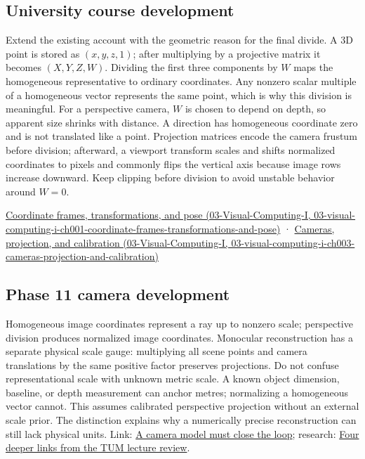\subsection{University course development}\label{appendix-cb3b26862282-university-course-development}

Extend the existing account with the geometric reason for the final divide. A 3D point is stored as \((x,y,z,1)\); after multiplying by a projective matrix it becomes \((X,Y,Z,W)\). Dividing the first three components by \(W\) maps the homogeneous representative to ordinary coordinates. Any nonzero scalar multiple of a homogeneous vector represents the same point, which is why this division is meaningful. For a perspective camera, \(W\) is chosen to depend on depth, so apparent size shrinks with distance. A direction has homogeneous coordinate zero and is not translated like a point. Projection matrices encode the camera frustum before division; afterward, a viewport transform scales and shifts normalized coordinates to pixels and commonly flips the vertical axis because image rows increase downward. Keep clipping before division to avoid unstable behavior around \(W=0\).

\href{../03-Visual-Computing-I/main.pdf\#nameddest=03-visual-computing-i-ch001-coordinate-frames-transformations-and-pose}{Coordinate frames, transformations, and pose (03-Visual-Computing-I, 03-visual-computing-i-ch001-coordinate-frames-transformations-and-pose)} · \href{../03-Visual-Computing-I/main.pdf\#nameddest=03-visual-computing-i-ch003-cameras-projection-and-calibration}{Cameras, projection, and calibration (03-Visual-Computing-I, 03-visual-computing-i-ch003-cameras-projection-and-calibration)}

\subsection{Phase 11 camera development}\label{appendix-cb3b26862282-phase-11-camera-development}

Homogeneous image coordinates represent a ray up to nonzero scale; perspective division produces normalized image coordinates. Monocular reconstruction has a separate physical scale gauge: multiplying all scene points and camera translations by the same positive factor preserves projections. Do not confuse representational scale with unknown metric scale. A known object dimension, baseline, or depth measurement can anchor metres; normalizing a homogeneous vector cannot. This assumes calibrated perspective projection without an external scale prior. The distinction explains why a numerically precise reconstruction can still lack physical units. Link: \hyperref[02-foundations-ii-ch037-a-camera-model-must-close-the-loop]{A camera model must close the loop}; research: \hyperref[02-foundations-ii-ch036-four-deeper-links-from-the-tum-lecture-review]{Four deeper links from the TUM lecture review}.
